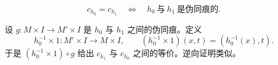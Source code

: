 \[
  c_{h_0}=c_{h_1}\quad\Longleftrightarrow\quad
  h_0\ \text{与}\ h_1\ \text{是伪同痕的}.
\]

\Proof 设 $g:M\times I\to M'\times I$ 是 $h_0$ 与 $h_1$ 之间的伪同痕。定义
\[
  h_0^{-1}\times1:M'\times I\longrightarrow M\times I,
  \qquad (h_0^{-1}\times1)(x,t)=(h_0^{-1}(x),t).
\]
于是 $(h_0^{-1}\times1)\circ g$ 给出 $c_{h_1}$ 与 $c_{h_0}$ 之间的等价。逆向证明类似。
\EndProof
